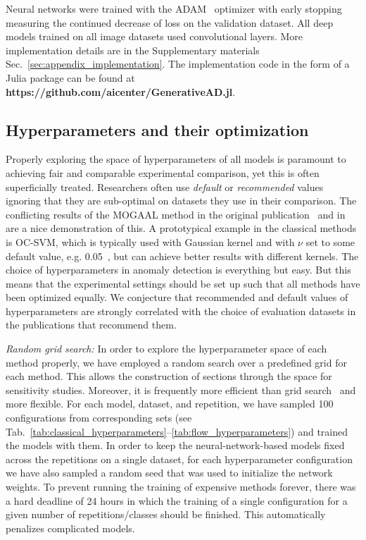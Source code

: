 Neural networks were trained with the ADAM~\cite{kingma2014adam} optimizer with early stopping measuring the continued decrease of loss on the validation dataset. All deep models trained on all image datasets used convolutional layers. More implementation details are in the Supplementary materials Sec.~\ref{sec:appendix_implementation}. The implementation code in the form of a Julia package can be found at \textbf{https://github.com/aicenter/GenerativeAD.jl}.

\subsection{Hyperparameters and their optimization}
\label{sub:hyperparameteroptimization}
Properly exploring the space of hyperparameters of all models is paramount to achieving fair and comparable experimental comparison, yet this is often superficially treated. Researchers often use \textit{default} or \textit{recommended} values ignoring that they are sub-optimal on datasets they use in their comparison. The conflicting results of the MOGAAL method in the original publication~\cite{liu2019generative} and in~\cite{wang2020advae} are a nice demonstration of this.  A prototypical example in the classical methods is OC-SVM, which is typically used with Gaussian kernel and with $\nu$ set to some default value, e.g. 0.05~\cite{pevny2016loda}, but can achieve better results with different kernels. The choice of hyperparameters in anomaly detection is everything but easy. But this means that the experimental settings should be set up such that all methods have been optimized equally. We conjecture that recommended and default values of hyperparameters are strongly correlated with the choice of evaluation datasets in the publications that recommend them.

\textit{Random grid search:} In order to explore the hyperparameter space of each method properly, we have employed a random search over a predefined grid for each method. This allows the construction of sections through the space for sensitivity studies. Moreover, it is frequently more efficient than grid search~\cite{bergstra2012random} and more flexible. For each model, dataset, and repetition, we have sampled 100 configurations from corresponding sets (see Tab.~\ref{tab:classical_hyperparameters}--\ref{tab:flow_hyperparameters}) and trained the models with them. In order to keep the neural-network-based models fixed across the repetitions on a single dataset, for each hyperparameter configuration we have also sampled a random seed that was used to initialize the network weights. To prevent running the training of expensive methods forever, there was a hard deadline of 24 hours in which the training of a single configuration for a given number of repetitions/classes should be finished. This automatically penalizes complicated models. 

